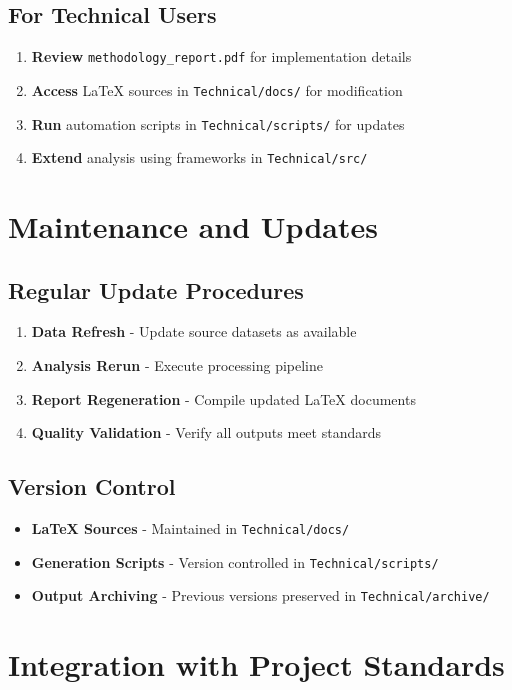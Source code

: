\documentclass[11pt,letterpaper]{article}
\begin{document}
\subsection{For Technical Users}
\begin{enumerate}
    \item \textbf{Review} \texttt{methodology\_report.pdf} for implementation details
    \item \textbf{Access} LaTeX sources in \texttt{Technical/docs/} for modification
    \item \textbf{Run} automation scripts in \texttt{Technical/scripts/} for updates
    \item \textbf{Extend} analysis using frameworks in \texttt{Technical/src/}
\end{enumerate}

\section{Maintenance and Updates}

\subsection{Regular Update Procedures}
\begin{enumerate}
    \item \textbf{Data Refresh} - Update source datasets as available
    \item \textbf{Analysis Rerun} - Execute processing pipeline
    \item \textbf{Report Regeneration} - Compile updated LaTeX documents
    \item \textbf{Quality Validation} - Verify all outputs meet standards
\end{enumerate}

\subsection{Version Control}
\begin{itemize}
    \item \textbf{LaTeX Sources} - Maintained in \texttt{Technical/docs/}
    \item \textbf{Generation Scripts} - Version controlled in \texttt{Technical/scripts/}
    \item \textbf{Output Archiving} - Previous versions preserved in \texttt{Technical/archive/}
\end{itemize}

\section{Integration with Project Standards}
\end{document}
